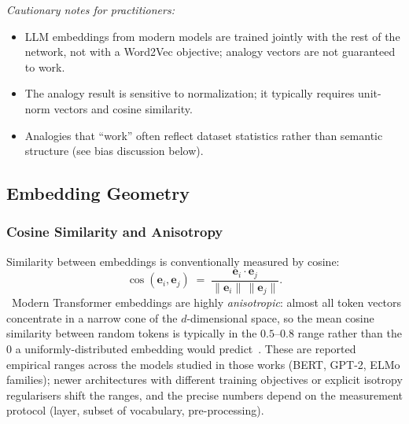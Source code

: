 \emph{Cautionary notes for practitioners:}
\begin{itemize}
  \item LLM embeddings from modern models are trained jointly with the
        rest of the network, not with a Word2Vec objective; analogy
        vectors are not guaranteed to work.
  \item The analogy result is sensitive to normalization; it typically
        requires unit-norm vectors and cosine similarity.
  \item Analogies that ``work'' often reflect dataset statistics rather
        than semantic structure (see bias discussion below).
\end{itemize}

\subsection{Embedding Geometry}

\subsubsection{Cosine Similarity and Anisotropy}

Similarity between embeddings is conventionally measured by cosine:
\begin{equation}
\cos(\mathbf{e}_i, \mathbf{e}_j) \;=\;
\frac{\mathbf{e}_i \cdot \mathbf{e}_j}
     {\|\mathbf{e}_i\|\,\|\mathbf{e}_j\|}.
\end{equation}
\Emp~Modern Transformer embeddings are highly \emph{anisotropic}: almost
all token vectors concentrate in a narrow cone of the $d$-dimensional
space, so the mean cosine similarity between random tokens is
typically in the $0.5$--$0.8$ range rather than the $0$ a uniformly-distributed
embedding would predict~\citep{ethayarajh2019contextual,gao2019representation}.
These are reported empirical ranges across the models studied in
those works (BERT, GPT-2, ELMo families); newer architectures with
different training objectives or explicit isotropy regularisers
shift the ranges, and the precise numbers depend on the measurement
protocol (layer, subset of vocabulary, pre-processing).

\begin{center}
\end{center}


